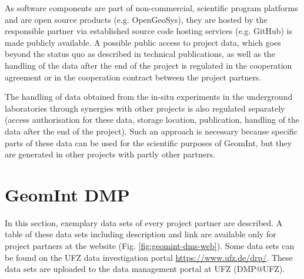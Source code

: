 As software components are part of non-commercial, scientific program platforms and are open source products (e.g. OpenGeoSys), they are hosted by the responsible partner via established source code hosting services (e.g. GitHub) is made publicly available. A possible public access to project data, which goes beyond the status quo as described in technical publications, as well as the handling of the data after the end of the project is regulated in the cooperation agreement or in the cooperation contract between the project partners. 

The handling of data obtained from the in-situ experiments in the underground laboratories through synergies with other projects is also regulated separately (access authorisation for these data, storage location, publication, handling of the data after the end of the project). Such an approach is necessary because specific parts of these data can be used for the scientific purposes of GeomInt, but they are generated in other projects with partly other partners.

\section{GeomInt DMP}

In this section, exemplary data sets of every project partner are described. A table of these data sets including description and link are available only for project partners at the website (Fig. \ref{fig:geomint-dms-web}). Some data sets can be found on the UFZ data investigation portal \url{https://www.ufz.de/drp/}. These data sets are uploaded to the data management portal at UFZ (DMP@UFZ).

